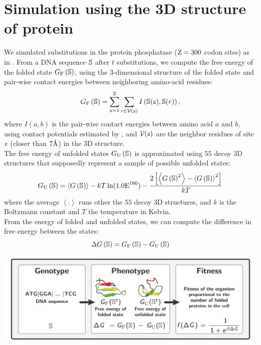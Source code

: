 \documentclass{article}
\begin{document}
\section{Simulation using the 3D structure of protein}
\label{sec:simulation-using-the-3d-structure-of-protein}

We simulated {substitutions} in the protein phosphatase ($\text{Z}=300$ {codon} sites) as in \citet{Goldstein2017}.
From a {DNA} sequence $\mathbb{S}$ after $t$ {substitutions}, we compute the free energy of the folded state $ G_{\text{F}} \left(\mathbb{S}\right)$, using the 3-dimensional structure of the folded state and pair-wise contact energies between neighboring amino-acid residues:
\begin{equation}
    G_{\text{F}} \left(\mathbb{S}\right) = \sum\limits_{\text{z}=1}^{\text{Z}} \sum\limits_{r \in \mathcal{V}(\text{z})} I \left(\mathbb{S}(\text{z}), \mathbb{S}(r) \right),
\end{equation}
where $I(a,b)$ is the pair-wise contact energies between amino acid $a$ and $b$, using contact potentials estimated by \citet{Miyazawa1985}, and $\mathcal{V}(\text{z})$ are the neighbor residues of site $\text{z}$ (closer than $7\text{\normalfont\AA}$) in the 3D structure.\\

The free energy of unfolded states $G_{\text{U}} \left(\mathbb{S}\right)$ is approximated using $55$ decoy 3D structures that supposedly represent a sample of possible unfolded states:
\begin{equation}
    G_{\text{U}} \left(\mathbb{S}\right) = \left\langle G\left(\mathbb{S}\right) \right\rangle - kT \ln (1.0\text{E}^{160}) - \dfrac{2 \left[ \left\langle G\left(\mathbb{S}\right)^2 \right\rangle - \left\langle G\left(\mathbb{S}\right) \right\rangle^2\right] }{kT}
\end{equation}
where the average $\left\langle . \right\rangle$ runs other the $55$ decoy 3D structures, and $k$ is the Boltzmann constant and $T$ the temperature in Kelvin.\\

From the energy of folded and unfolded states, we can compute the difference in free energy between the states:
\begin{equation}
    \Delta G\left(\mathbb{S}\right) = G_{\text{F}} \left(\mathbb{S}\right) - G_{\text{U}} \left(\mathbb{S}\right)
\end{equation}

\begin{center}
    \includegraphics[width=\textwidth] {ModelSimuFold.pdf}
\end{center}
\end{document}
